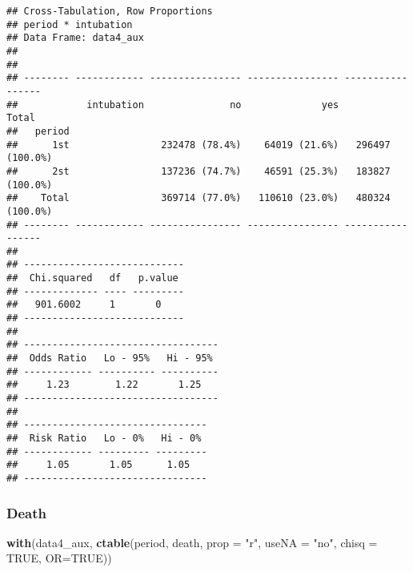 \documentclass[
]{article}
\newenvironment{Shaded}{\begin{snugshade}}{\end{snugshade}}
\newcommand{\DataTypeTok}[1]{\textcolor[rgb]{0.13,0.29,0.53}{#1}}
\newcommand{\KeywordTok}[1]{\textcolor[rgb]{0.13,0.29,0.53}{\textbf{#1}}}
\newcommand{\NormalTok}[1]{#1}
\newcommand{\OtherTok}[1]{\textcolor[rgb]{0.56,0.35,0.01}{#1}}
\newcommand{\StringTok}[1]{\textcolor[rgb]{0.31,0.60,0.02}{#1}}
\begin{document}
\begin{verbatim}
## Cross-Tabulation, Row Proportions  
## period * intubation  
## Data Frame: data4_aux  
## 
## 
## -------- ------------ ---------------- ---------------- -----------------
##            intubation               no              yes             Total
##   period                                                                 
##      1st                232478 (78.4%)    64019 (21.6%)   296497 (100.0%)
##      2st                137236 (74.7%)    46591 (25.3%)   183827 (100.0%)
##    Total                369714 (77.0%)   110610 (23.0%)   480324 (100.0%)
## -------- ------------ ---------------- ---------------- -----------------
## 
## ----------------------------
##  Chi.squared   df   p.value 
## ------------- ---- ---------
##   901.6002     1       0    
## ----------------------------
## 
## ----------------------------------
##  Odds Ratio   Lo - 95%   Hi - 95% 
## ------------ ---------- ----------
##     1.23        1.22       1.25   
## ----------------------------------
## 
## --------------------------------
##  Risk Ratio   Lo - 0%   Hi - 0% 
## ------------ --------- ---------
##     1.05       1.05      1.05   
## --------------------------------
\end{verbatim}

\hypertarget{death-1}{%
\subsubsection{Death}\label{death-1}}

\begin{Shaded}
\begin{Highlighting}[]
\KeywordTok{with}\NormalTok{(data4_aux, }\KeywordTok{ctable}\NormalTok{(period, death, }\DataTypeTok{prop =} \StringTok{"r"}\NormalTok{, }\DataTypeTok{useNA =} \StringTok{"no"}\NormalTok{, }\DataTypeTok{chisq =} \OtherTok{TRUE}\NormalTok{, }\DataTypeTok{OR=}\OtherTok{TRUE}\NormalTok{))}
\end{Highlighting}
\end{Shaded}
\end{document}
